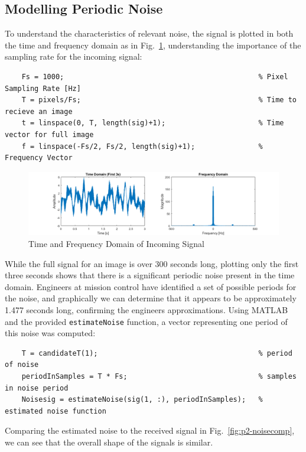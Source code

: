 \documentclass[12pt]{article}
\numberwithin{equation}{section}
\numberwithin{figure}{section}
\numberwithin{table}{section}
\begin{document}
\subsection{Modelling Periodic Noise}

To understand the characteristics of relevant noise, the signal is plotted in
both the time and frequency domain as in Fig.~\ref{fig:p2-timefreq},
understanding the importance of the sampling rate for the incoming signal:
\begin{verbatim}
    Fs = 1000;                                              % Pixel Sampling Rate [Hz]
    T = pixels/Fs;                                          % Time to recieve an image
    t = linspace(0, T, length(sig)+1);                      % Time vector for full image
    f = linspace(-Fs/2, Fs/2, length(sig)+1);               % Frequency Vector
\end{verbatim}

\begin{figure}[h]
    \centering
    \includegraphics{figures/p2-timefreq.png}
    \caption{Time and Frequency Domain of Incoming Signal\label{fig:p2-timefreq}}
\end{figure}

While the full signal for an image is over 300 seconds long, plotting only the
first three seconds shows that there is a significant periodic noise present in
the time domain. Engineers at mission control have identified a set of possible
periods for the noise, and graphically we can determine that it appears to be
approximately 1.477 seconds long, confirming the engineers approximations.
Using MATLAB and the provided \verb+estimateNoise+ function, a vector
representing one period of this noise was computed:
\begin{verbatim}
    T = candidateT(1);                                      % period of noise
    periodInSamples = T * Fs;                               % samples in noise period
    Noisesig = estimateNoise(sig(1, :), periodInSamples);   % estimated noise function
\end{verbatim}

Comparing the estimated noise to the received signal in
Fig.~\ref{fig:p2-noisecomp}, we can see that the overall shape of the signals
is similar.
\end{document}
